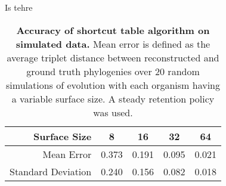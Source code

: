 \begin{table}[h]
\vspace{-0.8em}Is tehre
\centering
\begin{tabular}{r|c|c|c|c}
Surface Size & 8 & 16 & 32 & 64  \\
\hline 
Mean Error & 0.373 & 0.191 & 0.095 & 0.021 \\
Standard Deviation & 0.240 & 0.156 & 0.082 & 0.018
\end{tabular}
\caption{\textbf{Accuracy of shortcut table algorithm on simulated data.}
\small Mean error is defined as the average triplet distance between reconstructed and ground truth phylogenies over 20 random simulations of evolution with each organism having a variable surface size. A steady retention policy was used.
}
\label{table:validation}

\vspace{-0.8em}
\end{table}
